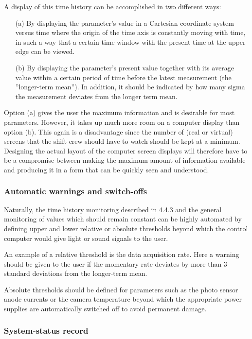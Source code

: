 A display of this time history can be accomplished in two different ways:

\begin{itemize}
\item[(a)]  By displaying the parameter's value in a Cartesian coordinate
system versus time where the origin of the time axis is constantly moving
with time, in such a way that a certain time window with the present time at
the upper edge can be viewed.

\item[(b)]  By displaying the parameter's present value together with its
average value within a certain period of time before the latest measurement
(the ''longer-term mean''). In addition, it should be indicated by how many
sigma the measurement deviates from the longer term mean.
\end{itemize}

Option (a) gives the user the maximum information and is desirable for most
parameters. However, it takes up much more room on a computer display than
option (b). This again is a disadvantage since the number of (real or
virtual) screens that the shift crew should have to watch should be kept at
a minimum. Designing the actual layout of the computer screen displays will
therefore have to be a compromise between making the maximum amount of
information available and producing it in a form that can be quickly seen
and understood.

\subsubsection{Automatic warnings and switch-offs}

Naturally, the time history monitoring described in 4.4.3 and the general
monitoring of values which should remain constant can be highly automated by
defining upper and lower relative or absolute thresholds beyond which the
control computer would give light or sound signals to the user.

An example of a relative threshold is the data acquisition rate. Here a
warning should be given to the user if the momentary rate deviates by more
than 3 standard deviations from the longer-term mean.

Absolute thresholds should be defined for parameters such as the photo
sensor anode currents or the camera temperature beyond which the appropriate
power supplies are automatically switched off to avoid permanent damage.

\subsubsection{System-status record}

